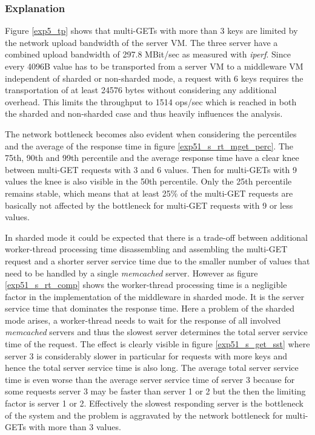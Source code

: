 \documentclass[report.tex]{subfiles}
\begin{document}
\subsubsection{Explanation}

Figure \ref{exp5_tp} shows that multi-GETs with more than 3 keys are limited by the network upload bandwidth of the server VM. The three server have a combined upload bandwidth of 297.8 MBit/sec as measured with \emph{iperf}. Since every 4096B value has to be transported from a server VM to a middleware VM independent of sharded or non-sharded mode, a request with 6 keys requires the transportation of at least 24576 bytes without considering any additional overhead. This limits the throughput to 1514 ops/sec which is reached in both the sharded and non-sharded case and thus heavily influences the analysis.

The network bottleneck becomes also evident when considering the percentiles and the average of the response time in figure \ref{exp51_s_rt_mget_perc}. The 75th, 90th and 99th percentile and the average response time have a clear knee between multi-GET requests with 3 and 6 values. Then for multi-GETs with 9 values the knee is also visible in the 50th percentile. Only the 25th percentile remains stable, which means that at least 25\% of the multi-GET requests are basically not affected by the bottleneck for multi-GET requests with 9 or less values.

In sharded mode it could be expected that there is a trade-off between additional worker-thread processing time disassembling and assembling the multi-GET request and a shorter server service time due to the smaller number of values that need to be handled by a single \emph{memcached} server. However as figure \ref{exp51_s_rt_comp} shows the worker-thread processing time is a negligible factor in the implementation of the middleware in sharded mode. It is the server service time that dominates the response time. Here a problem of the sharded mode arises, a worker-thread needs to wait for the response of all involved \emph{memcached} servers and thus the slowest server determines the total server service time of the request.  The effect is clearly visible in figure \ref{exp51_s_get_sst} where server 3 is considerably slower in particular for requests with more keys and hence the total server service time is also long. The average total server service time is even worse than the average server service time of server 3 because for some requests server 3 may be faster than server 1 or 2 but the then the limiting factor is server 1 or 2. Effectively the slowest responding server is the bottleneck of the system and the problem is aggravated by the network bottleneck for multi-GETs with more than 3 values.
\end{document}
